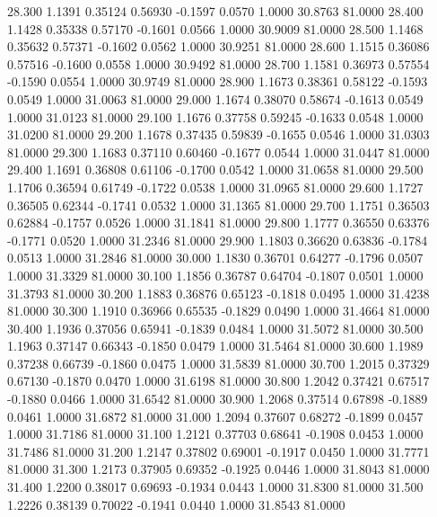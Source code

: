   28.300   1.1391   0.35124   0.56930  -0.1597   0.0570   1.0000  30.8763  81.0000
  28.400   1.1428   0.35338   0.57170  -0.1601   0.0566   1.0000  30.9009  81.0000
  28.500   1.1468   0.35632   0.57371  -0.1602   0.0562   1.0000  30.9251  81.0000
  28.600   1.1515   0.36086   0.57516  -0.1600   0.0558   1.0000  30.9492  81.0000
  28.700   1.1581   0.36973   0.57554  -0.1590   0.0554   1.0000  30.9749  81.0000
  28.900   1.1673   0.38361   0.58122  -0.1593   0.0549   1.0000  31.0063  81.0000
  29.000   1.1674   0.38070   0.58674  -0.1613   0.0549   1.0000  31.0123  81.0000
  29.100   1.1676   0.37758   0.59245  -0.1633   0.0548   1.0000  31.0200  81.0000
  29.200   1.1678   0.37435   0.59839  -0.1655   0.0546   1.0000  31.0303  81.0000
  29.300   1.1683   0.37110   0.60460  -0.1677   0.0544   1.0000  31.0447  81.0000
  29.400   1.1691   0.36808   0.61106  -0.1700   0.0542   1.0000  31.0658  81.0000
  29.500   1.1706   0.36594   0.61749  -0.1722   0.0538   1.0000  31.0965  81.0000
  29.600   1.1727   0.36505   0.62344  -0.1741   0.0532   1.0000  31.1365  81.0000
  29.700   1.1751   0.36503   0.62884  -0.1757   0.0526   1.0000  31.1841  81.0000
  29.800   1.1777   0.36550   0.63376  -0.1771   0.0520   1.0000  31.2346  81.0000
  29.900   1.1803   0.36620   0.63836  -0.1784   0.0513   1.0000  31.2846  81.0000
  30.000   1.1830   0.36701   0.64277  -0.1796   0.0507   1.0000  31.3329  81.0000
  30.100   1.1856   0.36787   0.64704  -0.1807   0.0501   1.0000  31.3793  81.0000
  30.200   1.1883   0.36876   0.65123  -0.1818   0.0495   1.0000  31.4238  81.0000
  30.300   1.1910   0.36966   0.65535  -0.1829   0.0490   1.0000  31.4664  81.0000
  30.400   1.1936   0.37056   0.65941  -0.1839   0.0484   1.0000  31.5072  81.0000
  30.500   1.1963   0.37147   0.66343  -0.1850   0.0479   1.0000  31.5464  81.0000
  30.600   1.1989   0.37238   0.66739  -0.1860   0.0475   1.0000  31.5839  81.0000
  30.700   1.2015   0.37329   0.67130  -0.1870   0.0470   1.0000  31.6198  81.0000
  30.800   1.2042   0.37421   0.67517  -0.1880   0.0466   1.0000  31.6542  81.0000
  30.900   1.2068   0.37514   0.67898  -0.1889   0.0461   1.0000  31.6872  81.0000
  31.000   1.2094   0.37607   0.68272  -0.1899   0.0457   1.0000  31.7186  81.0000
  31.100   1.2121   0.37703   0.68641  -0.1908   0.0453   1.0000  31.7486  81.0000
  31.200   1.2147   0.37802   0.69001  -0.1917   0.0450   1.0000  31.7771  81.0000
  31.300   1.2173   0.37905   0.69352  -0.1925   0.0446   1.0000  31.8043  81.0000
  31.400   1.2200   0.38017   0.69693  -0.1934   0.0443   1.0000  31.8300  81.0000
  31.500   1.2226   0.38139   0.70022  -0.1941   0.0440   1.0000  31.8543  81.0000
